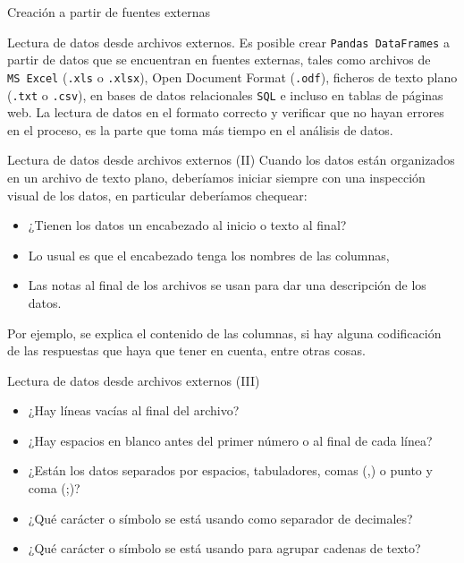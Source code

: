 \documentclass[
  ignorenonframetext,
  aspectratio=169,
  spanish,
]{beamer}
\providecommand{\tightlist}{%
  \setlength{\itemsep}{0pt}\setlength{\parskip}{0pt}}
\begin{document}
\begin{frame}[fragile]{Creación a partir de fuentes externas}
\begin{block}{Lectura de datos desde archivos externos.}
\label{sec-lecturaDatosExternos}
 Es posible crear
\texttt{Pandas\ DataFrames} a partir de datos que se encuentran en
fuentes externas, tales como archivos de \texttt{MS\ Excel}
(\texttt{.xls} o \texttt{.xlsx}), Open Document Format (\texttt{.odf}),
ficheros de texto plano (\texttt{.txt} o \texttt{.csv}), en bases de
datos relacionales \texttt{SQL} e incluso en tablas de páginas web. La
lectura de datos en el formato correcto y verificar que no hayan errores
en el proceso, es la parte que toma más tiempo en el análisis de datos.
\end{block}

\begin{block}{Lectura de datos desde archivos externos (II)}
\label{lectura-de-datos-desde-archivos-externos-ii}
Cuando los datos están organizados en un archivo de texto plano,
deberíamos iniciar siempre con una inspección visual de los datos, en
particular deberíamos chequear:

\begin{itemize}
\item
  ¿Tienen los datos un encabezado al inicio o texto al final?
\item
  Lo usual es que el encabezado tenga los nombres de las columnas,
\item
  Las notas al final de los archivos se usan para dar una descripción de
  los datos.
\end{itemize}

Por ejemplo, se explica el contenido de las columnas, si hay alguna
codificación de las respuestas que haya que tener en cuenta, entre otras
cosas.
\end{block}

\begin{block}{Lectura de datos desde archivos externos (III)}
\label{lectura-de-datos-desde-archivos-externos-iii}
\begin{itemize}
\tightlist
\item
  ¿Hay líneas vacías al final del archivo?
\item
  ¿Hay espacios en blanco antes del primer número o al final de cada
  línea?
\item
  ¿Están los datos separados por espacios, tabuladores, comas (,) o
  punto y coma (;)?
\item
  ¿Qué carácter o símbolo se está usando como separador de decimales?
\item
  ¿Qué carácter o símbolo se está usando para agrupar cadenas de texto?
\end{itemize}
\end{block}


\end{frame}
\end{document}
